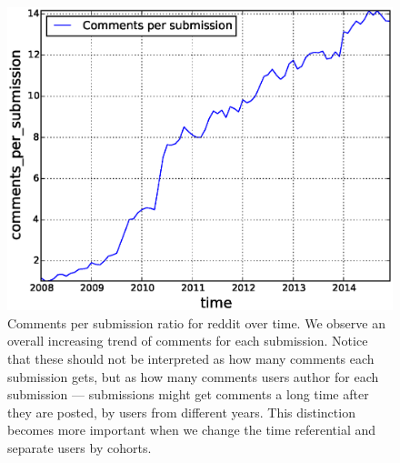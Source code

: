 \begin{figure}[!tb]
\centering
\includegraphics[scale=0.4]{./images/comments_per_submissions_over_time_total.eps}
\caption{Comments per submission ratio for reddit over time. We observe an overall increasing trend of comments for each submission. Notice that these should not be interpreted as how many comments each submission gets, but as how many comments users author for each submission --- submissions might get comments a long time after they are posted, by users from different years. This distinction becomes more important when we change the time referential and separate users by cohorts.}
\label{fig:comments_per_submissions_over_time_total}
\end{figure}

